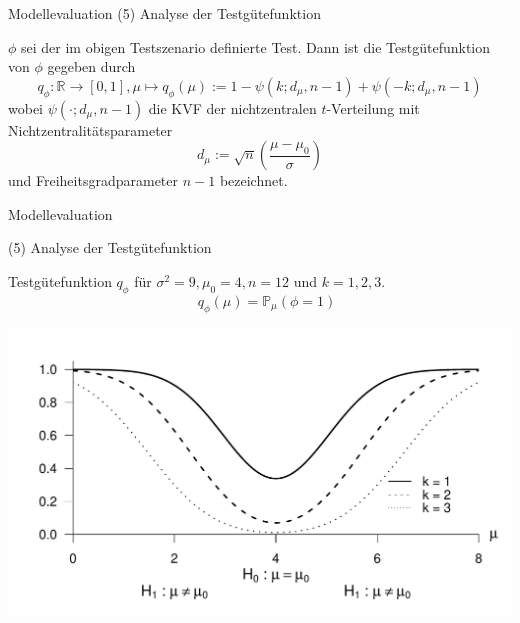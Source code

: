 \documentclass[
  8pt,
  ignorenonframetext,
]{beamer}
\begin{document}
\begin{frame}{Modellevaluation}
\protect\hypertarget{modellevaluation-7}{}
\noindent (5) Analyse der Testgütefunktion \vspace{1cm}

\small
\begin{theorem}[Testgütefunktion]
\justifying
\normalfont
$\phi$ sei der im obigen Testszenario definierte Test. Dann ist die
Testgütefunktion von $\phi$ gegeben durch
\begin{equation}
q_{\phi} : \mathbb{R} \to [0,1],
\mu \mapsto q_{\phi}(\mu)
:= 1 - \psi(k;d_\mu,n-1) + \psi(-k;d_\mu,n-1)
\end{equation}
wobei $\psi(\cdot; d_\mu, n-1)$  die KVF der nichtzentralen $t$-Verteilung mit
Nichtzentralitätsparameter
\begin{equation}
d_\mu := \sqrt{n}\left(\frac{\mu - \mu_0}{\sigma}\right)
\end{equation}
und Freiheitsgradparameter $n-1$ bezeichnet.
\end{theorem}
\end{frame}

\begin{frame}{Modellevaluation}
\protect\hypertarget{modellevaluation-8}{}

\noindent (5) Analyse der Testgütefunktion \vspace{5mm}

\small

\center Testgütefunktion \(q_\phi\) für
\(\sigma^2 = 9, \mu_0 = 4, n = 12\) und \(k = 1,2,3\). \vspace{2mm}
\begin{equation*}
\quad q_{\phi}(\mu) = \mathbb{P}_\mu(\phi = 1)
\end{equation*}

\begin{center}\includegraphics[width=0.8\linewidth]{9_Abbildungen/alm_9_t_test_ungerichtet_guetefunktion} \end{center}
\end{frame}
\end{document}
